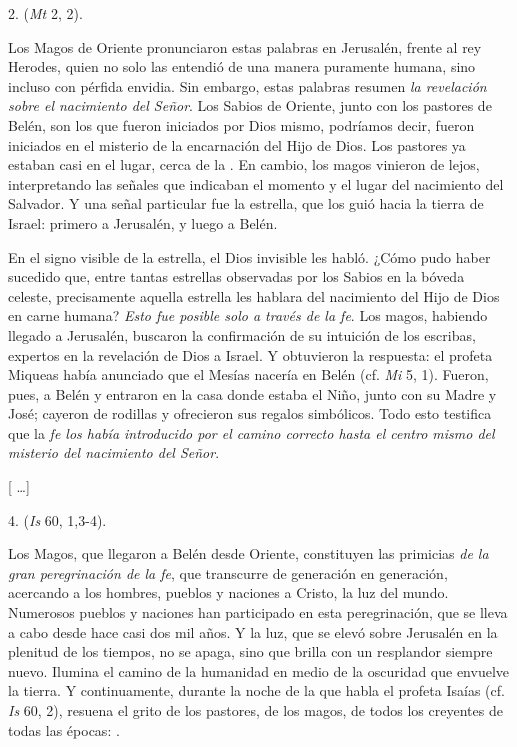 \begin{body}
					2.  (\emph{Mt} 2, 2).
					
					Los Magos de Oriente pronunciaron estas palabras en Jerusalén, frente al rey Herodes, quien no solo las entendió de una manera puramente humana, sino incluso con pérfida envidia. Sin embargo, estas palabras resumen \emph{la revelación sobre el nacimiento del Señor}. Los Sabios de Oriente, junto con los pastores de Belén, son los que fueron iniciados por Dios mismo, podríamos decir, fueron iniciados en el misterio de la encarnación del Hijo de Dios. Los pastores ya estaban casi en el lugar, cerca de la . En cambio, los magos vinieron de lejos, interpretando las señales que indicaban el momento y el lugar del nacimiento del Salvador. Y una señal particular fue la estrella, que los guió hacia la tierra de Israel: primero a Jerusalén, y luego a Belén.
					
					En el signo visible de la estrella, el Dios invisible les habló. ¿Cómo pudo haber sucedido que, entre tantas estrellas observadas por los Sabios en la bóveda celeste, precisamente aquella estrella les hablara del nacimiento del Hijo de Dios en carne humana? \emph{Esto fue posible solo a través de la fe}. Los magos, habiendo llegado a Jerusalén, buscaron la confirmación de su intuición de los escribas, expertos en la revelación de Dios a Israel. Y obtuvieron la respuesta: el profeta Miqueas había anunciado que el Mesías nacería en Belén (cf. \emph{Mi} 5, 1). Fueron, pues, a Belén y entraron en la casa donde estaba el Niño, junto con su Madre y José; cayeron de rodillas y ofrecieron sus regalos simbólicos. Todo esto testifica que la \emph{fe los había introducido por el camino correcto hasta el centro mismo del misterio del nacimiento del Señor}.
					
					{[} \ldots{}{]}
					
					4.  (\emph{Is} 60, 1,3-4).
					
					Los Magos, que llegaron a Belén desde Oriente, constituyen las primicias \emph{de la gran peregrinación de la fe}, que transcurre de generación en generación, acercando a los hombres, pueblos y naciones a Cristo, la luz del mundo. Numerosos pueblos y naciones han participado en esta peregrinación, que se lleva a cabo desde hace casi dos mil años. Y la luz, que se elevó sobre Jerusalén en la plenitud de los tiempos, no se apaga, sino que brilla con un resplandor siempre nuevo. Ilumina el camino de la humanidad en medio de la oscuridad que envuelve la tierra. Y continuamente, durante la noche de la que habla el profeta Isaías (cf. \emph{Is} 60, 2), resuena el grito de los pastores, de los magos, de todos los creyentes de todas las épocas: .
				\end{body}
			
